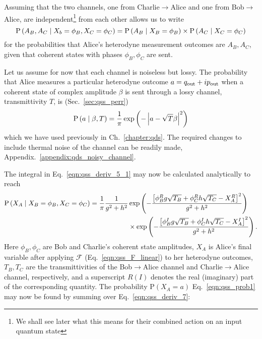 Assuming that the two channels, one from Charlie$\rightarrow$Alice and one from Bob$\rightarrow$Alice, are independent\footnote{We shall see later what this means for their combined action on an input quantum state} from each other allows us to write
\begin{equation}\label{eqn:qss_deriv_6}
\text{P}\left(A_B, A_C \; \middle| \; X_b=\phi_B, X_C=\phi_C\right) = \text{P}\left(A_B \; \middle| \; X_B=\phi_B\right) \times \text{P}\left(A_C \; \middle| \; X_C=\phi_C\right)
\end{equation}
for the probabilities that Alice's heterodyne measurement outcomes are $A_B, A_C$, given that coherent states with phases $\phi_B, \phi_C$ are sent.

Let us assume for now that each channel is noiseless but lossy. The probability that Alice measures a particular heterodyne outcome $a = q_{\text{out}} + i p_{\text{out}}$ when a coherent state of complex amplitude $\beta$ is sent through a lossy channel, transmittivity $T$, is (Sec.~\ref{sec:qss_perr}) %
\begin{equation}\label{eqn:qss_channel_classical_prob}
\text{P}\left(a \; \middle| \; \beta, T\right) = \frac{1}{\pi}\exp\left( - \left| a - \sqrt{T}\beta \right|^2\right)
\end{equation}
which we have used previously in Ch.~\ref{chapter:qds}. The required changes to include thermal noise of the channel can be readily made, Appendix.~\ref{appendix:qds_noisy_channel}.

The integral in Eq.~\ref{eqn:qss_deriv_5_1} may now be calculated analytically to reach 
\begin{align}\label{eqn:qss_deriv_7}
\text{P}\left(X_A \given X_B=\phi_B, X_C=\phi_C\right) = \frac{1}{\pi} \frac{1}{g^2 + h^2} &\exp \left( - \frac{\left[\phi_B^R g \sqrt{T_B} + \phi_C^R h \sqrt{T_C} - X_A^R \right]^2}{g^2 + h^2}\right) \notag \\
%
&\times \exp \left( - \frac{\left[\phi_B^I g \sqrt{T_B} + \phi_C^I h \sqrt{T_C} - X_A^I \right]^2}{g^2 + h^2} \right).
\end{align}
Here $\phi_B, \phi_C$ are Bob and Charlie's coherent state amplitudes, $X_A$ is Alice's final variable after applying $\mathcal{F}$ (Eq.~\ref{eqn:qss_F_linear}) to her heterodyne outcomes, $T_B, T_C$ are the transmittivities of the Bob$\rightarrow$Alice channel and Charlie$\rightarrow$Alice channel, respectively, and a superscript $R\left(I\right)$ denotes the real (imaginary) part of the corresponding quantity. %
The probability $\text{P}\left(X_A=a\right)$ Eq.~\ref{eqn:qss_prob1} may now be found by summing over Eq.~\ref{eqn:qss_deriv_7}:


